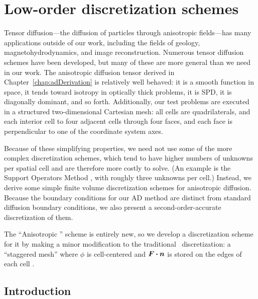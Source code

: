
\chapter{Low-order discretization schemes} \label{chap:implementation}

Tensor diffusion---the diffusion of particles through anisotropic fields---has
many applications outside of our work, including the fields of geology,
magnetohydrodynamics, and image reconstruction. Numerous tensor diffusion
schemes have been developed, but many of these are more general than we need in
our work. The anisotropic diffusion tensor derived in
Chapter~\ref{chap:adDerivation} is relatively well behaved: it is a smooth
function in space, it tends toward isotropy in optically thick problems, it is
SPD, it is diagonally dominant, and so forth. Additionally, our test problems
are executed in a structured
two-dimensional Cartesian mesh: all cells are quadrilaterals, and each
interior cell to four adjacent cells through four faces, and each face is
perpendicular to one of the coordinate system axes.

Because of these simplifying properties, we need not use some of the more
complex discretization schemes, which tend to have higher numbers of unknowns
per spatial cell and are therefore more costly to solve.
(An example is the Support Operators Method \cite{Mor1998,Run2006}, with
roughly three unknowns per cell.) Instead, we derive some simple
finite volume discretization schemes for anisotropic diffusion. Because the
boundary conditions for our AD method are distinct from standard diffusion
boundary conditions, we also present a second-order-accurate discretization of
them.

The ``Anisotropic \Pone'' scheme is entirely new, so we develop a discretization
scheme for it by making a minor modification to the traditional \Pone\
discretization: a
``staggered mesh'' where $\phi$ is cell-centered and $\bm{F}\bm{\cdot} \bm{n}$ is
stored on the edges of each cell \cite{War2003}.

\section{Introduction}

